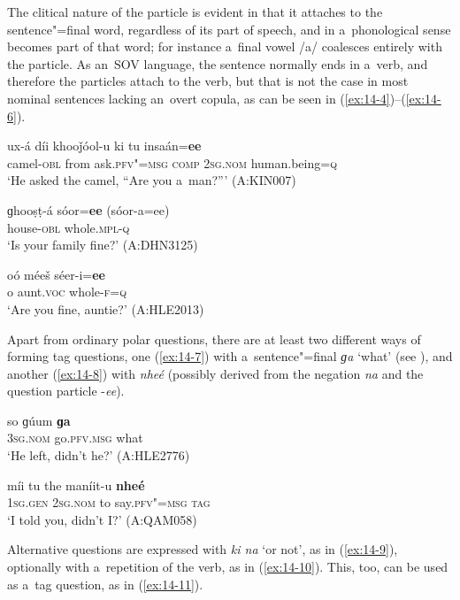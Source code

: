 The clitical nature of the particle is evident in that it attaches to the sentence"=final word, regardless of its part of speech, and in a~phonological sense becomes part of that word; for instance a~final vowel /a/ coalesces entirely with the particle. As an~SOV language, the sentence normally ends in a~verb, and therefore the particles attach to the verb, but that is not the case in most nominal sentences lacking an~overt copula, as can be seen in (\ref{ex:14-4})--(\ref{ex:14-6}).

\begin{exe}
\ex
\label{ex:14-4}
\gll ux-á díi khooǰóol-u ki tu insaán=\textbf{ee} \\
camel-\textsc{obl} from ask.\textsc{pfv"=msg} \textsc{comp} \textsc{2sg.nom} human.being=\textsc{q} \\
\glt `He asked the camel, ``Are you a~man?''' (A:KIN007)

\ex
\label{ex:14-5}
\gll ɡhooṣṭ-á sóor=\textbf{ee} (sóor-a=ee) \\
house-\textsc{obl} whole.\textsc{mpl-q} \\
\glt `Is your family fine?' (A:DHN3125)

\ex
\label{ex:14-6}
\gll oó méeš séer-i=\textbf{ee} \\
o aunt.\textsc{voc} whole-\textsc{f=q} \\
\glt `Are you fine, auntie?' (A:HLE2013)
\end{exe}

Apart from ordinary polar questions, there are at least two different ways of forming tag questions, one (\ref{ex:14-7}) with a~sentence"=final \textit{ɡa} `what' (see ), and another (\ref{ex:14-8}) with \textit{nheé} (possibly derived from the negation \textit{na} and the question particle -\textit{ee}).

\begin{exe}
\ex
\label{ex:14-7}
\gll so ɡúum \textbf{ɡa} \\
\textsc{3sg.nom} go.\textsc{pfv.msg} what \\
\glt `He left, didn't he?' (A:HLE2776)

\ex
\label{ex:14-8}
\gll míi tu the maníit-u \textbf{nheé} \\
\textsc{1sg.gen} \textsc{2sg.nom} to say.\textsc{pfv"=msg} \textsc{tag} \\
\glt `I told you, didn't I?' (A:QAM058)
\end{exe}

Alternative questions are expressed with \textit{ki na} `or not', as in (\ref{ex:14-9}), optionally with a~repetition of the verb, as in (\ref{ex:14-10}). This, too, can be used as a~tag question, as in (\ref{ex:14-11}).

